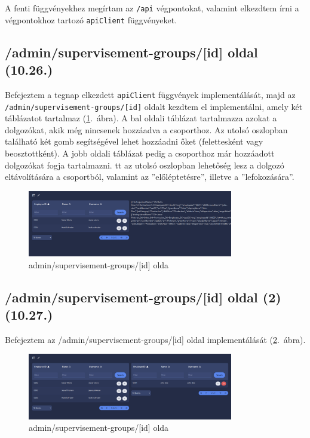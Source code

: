 \documentclass[a4paper]{article}
\newcommand{\inltxt}[1]{\texttt{#1}}
\begin{document}
A fenti függvényekhez megírtam az \inltxt{/api} végpontokat, valamint elkezdtem írni a végpontokhoz
tartozó \inltxt{apiClient} függvényeket.


\subsection{/admin/supervisement-groups/[id] oldal (10.26.)}

Befejeztem a tegnap elkezdett \inltxt{apiClient} függvények implementálását, majd az
\inltxt{/admin/supervisement-groups/[id]} oldalt kezdtem el implementálni, amely két táblázatot
tartalmaz (\ref{fig:sup_edit}.~ábra). A bal oldali táblázat tartalmazza azokat a dolgozókat, akik még nincsenek hozzáadva a csoporthoz. Az
utolsó oszlopban található két gomb segítségével lehet hozzáadni őket (felettesként vagy
beosztottként). A jobb oldali táblázat pedig a csoporthoz már hozzáadott dolgozókat fogja tartalmazni.
tt az utolsó oszlopban lehetőség lesz a dolgozó eltávolítására a csoportból, valamint az
''előléptetésre'', illetve a ''lefokozására''.


\begin{figure}[ht]
  \centering
  \includegraphics[width = 0.8\textwidth]{images/sup_edit.png}
  \caption{admin/supervisement-groups/[id] olda}
  \label{fig:sup_edit}
\end{figure}

\subsection{/admin/supervisement-groups/[id] oldal (2) (10.27.)}

Befejeztem az /admin/supervisement-groups/[id] oldal implementálását (\ref{fig:sup_edit_final}.~ábra).

\begin{figure}[ht]
  \centering
  \includegraphics[width = 0.8\textwidth]{images/sup_edit_final.png}
  \caption{admin/supervisement-groups/[id] olda}
  \label{fig:sup_edit_final}
\end{figure}
\end{document}
